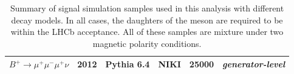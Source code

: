 \begin{table}[h!]
\begin{center}
\begin{tabular}{l l l l l l}
			$B^{+} \rightarrow \mu^{+} \mu^{-} \mu^{+} \nu$ & 2012 & Pythia 6.4\cite{pythia6} & NIKI & 25000 & \textit{generator-level}\\ %
%
			\bottomrule
		\end{tabular}
	\end{center}
	\caption{Summary of signal simulation samples used in this analysis with different decay models. In all cases, the daughters of the \Bpm meson are required to be within the \gls{LHCb} acceptance. All of these samples are mixture under two magnetic polarity conditions.}
	\label{tab:MCPPass}
\end{table}


